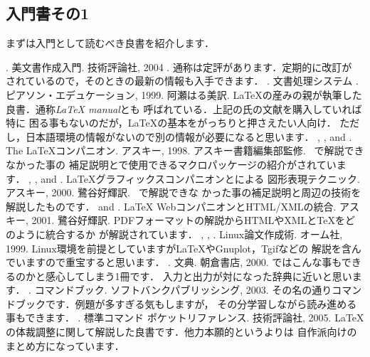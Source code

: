 \subsection{入門書その1}
まずは入門として読むべき良書を紹介します．
\begin{myreferences}
%
. \newblock
[改訂第3版] {\LaTeXe}美文書作成入門.
技術評論社, 2004 .
\sanko
通称は定評があります．定期的に改訂が
されているので，そのときの最新の情報も入手できます．
%
. \newblock
文書処理システム {\LaTeXe}. 
ピアソン・エデュケーション, 1999.
阿瀬はる美訳.
\sanko
{\LaTeX}の産みの親が執筆した良書．通称\emph{{\LaTeX} manual}とも
呼ばれている．上記の氏の文献を購入していれば特に
困る事もないのだが，{\LaTeX}の基本をがっちりと押さえたい人向け．
ただし，日本語環境の情報がないので別の情報が必要になると思います．%
%
, , and . \newblock
The {\LaTeX}コンパニオン.
アスキー, 1998.  
アスキー書籍編集部監修. 
\sanko
{}~\cite{latexbook}で解説できなかった事の
補足説明と{\LaTeXe}で使用できるマクロパッケージの紹介がされています．
%
, , and . \newblock
{\LaTeX}グラフィックスコンパニオン\zdash{\TeX}と{\PS}による
図形表現テクニック.
アスキー, 2000. 
鷺谷好輝訳.
\sanko
{}~\cite{latexcomp}で解説できな
かった事の補足説明と{\PS}周辺の技術を解説したものです．
%
 and . \newblock
{\LaTeX} Webコンパニオン\zdash{\TeX}とHTML/XMLの統合.
アスキー, 2001.  
鷺谷好輝訳. 
\sanko
PDFフォーマットの解説からHTMLやXMLと{\TeX}をどのように統合するか
が解説されています．
%	
, , . \newblock
 Linux論文作成術.  オーム社, 1999. 
\sanko
Linux環境を前提としていますが{\LaTeX}やGnuplot，Tgifなどの
解説を含んでいますので重宝すると思います．
%
.  \newblock
{\LaTeXe} 文典. 
朝倉書店, 2000.
\sanko
{\LaTeXe}ではこんな事もできるのかと感心してしまう1冊です．
入力と出力が対になった辞典に近いと思います．
%
. \newblock
{\LaTeXe} コマンドブック.
ソフトバンクパブリッシング, 2003. 
\sanko
その名の通りコマンドブックです．例題が多すぎる気もしますが，
その分学習しながら読み進める事もできます．
%
. \newblock
\LaTeXe 標準コマンド ポケットリファレンス. 
技術評論社, 2005. 
\sanko
\LaTeX の体裁調整に関して解説した良書です．他力本願的というよりは
自作派向けのまとめ方になっています．
\end{myreferences}

